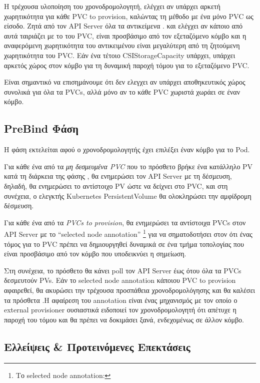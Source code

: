 Η τρέχουσα υλοποίηση του χρονοδρομολογητή, ελέγχει αν υπάρχει αρκετή
χωρητικότητα για κάθε PVC to provision, καλώντας τη μέθοδο  με
ένα μόνο PVC ως είσοδο. Ζητά από τον  API Server όλα τα αντικείμενα
. και ελέγχει αν κάποιο από αυτά ταιριάζει με το
 του PVC, είναι προσβάσιμο από τον εξεταζόμενο κόμβο και η
αναφερόμενη χωρητικότητα του αντικειμένου είναι μεγαλύτερη από τη ζητούμενη
χωρητικότητα του PVC. Εάν ένα τέτοιο CSIStorageCapacity υπάρχει, υπάρχει αρκετός
χώρος στον κόμβο για τη δυναμική παροχή τόμου για το εξεταζόμενο PVC.

Είναι σημαντικό να επισημάνουμε ότι δεν ελεγχει αν υπάρχει αποθηκευτικός χώρος
συνολικά για όλα τα PVCs, αλλά μόνο αν το κάθε PVC χωριστά χωράει σε έναν κόμβο.

\subsection*{PreBind Φάση}

Η φάση  εκτελείται αφού ο χρονοδρομολογητής έχει επιλέξει έναν κόμβο
για  το Pod.

Για κάθε ένα από τα \textit{μη δεσμευμένα PVC} που το πρόσθετο βρήκε ένα
κατάλληλο PV κατά τη διάρκεια της φάσης , θα ενημερώσει τον API
Server με τη δέσμευση, δηλαδή, θα ενημερώσει το αντίστοιχο PV ώστε να δείχνει
στο PVC, και στη συνέχεια, ο ελεγκτής Kubernetes PersistentVolume θα ολοκληρώσει
την αμφίδρομη δέσμευση.

Για κάθε ένα από τα \textit{PVCs to provision}, θα ενημερώσει τα αντίστοιχα PVCs
στον API Server με το  ``selected node annotation'' \footnote{Το selected node
annotation: } για να σηματοδοτήσει στον
 ότι ένας τόμος για το PVC πρέπει να δημιουργηθεί δυναμικά
σε ένα τμήμα τοπολογίας που είναι προσβάσιμο από τον κόμβο που υποδεικνύει η
σημείωση. 

Στη συνέχεια, το πρόσθετο θα κάνει poll τον API Server έως ότου όλα τα PVCs
δεσμευτούν  PVs. Εάν το selected node annotation κάποιου PVC to provision
αφαιρεθεί, θα ακυρώσει την τρέχουσα προσπάθεια χρονοδρομολόγησης και θα
καλέσει τα πρόσθετα .Η αφαίρεση του annotation είναι ένας
μηχανισμός με τον οποίο ο external provisioner ουσιαστικά ειδοποιεί τον
χρονοδρομολογητή ότι απέτυχε η παροχή του τόμου και θα πρέπει να δοκιμάσει ξανά,
ενδεχομένως σε άλλον κόμβο.


\subsection{Ελλείψεις \& Προτεινόμενες Επεκτάσεις}

